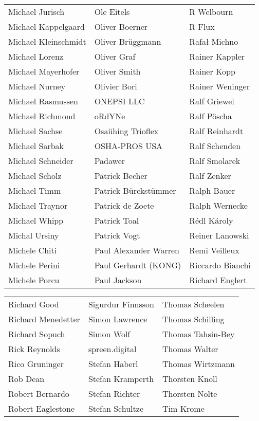 \begin{small}
\begin{tabular}{p{4cm}p{4cm}p{4cm}}
Michael Jurisch & Ole Eitels & R Welbourn \\
Michael Kappelgaard & Oliver Boerner & R-Flux \\
Michael Kleinschmidt & Oliver Brüggmann & Rafał Michno \\
Michael Lorenz & Oliver Graf & Rainer Kappler \\
Michael Mayerhofer & Oliver Smith & Rainer Kopp \\
Michael Nurney & Olivier Bori & Rainer Weninger \\
Michael Rasmussen & ONEPSI LLC & Ralf Griewel \\
Michael Richmond & oRdYNe & Ralf Pöscha \\
Michael Sachse & Osaühing Trioflex & Ralf Reinhardt \\
Michael Sarbak & OSHA-PROS USA & Ralf Schenden \\
Michael Schneider & Padawer & Ralf Smolarek \\
Michael Scholz & Patrick Becher & Ralf Zenker \\
Michael Timm & Patrick Bürckstümmer & Ralph Bauer \\
Michael Traynor & Patrick de Zoete & Ralph Wernecke \\
Michael Whipp & Patrick Toal & Rédl Károly \\
Michal Ursiny & Patrick Vogt & Reiner Lanowski \\
Michele Chiti & Paul Alexander Warren & Remi Veilleux \\
Michele Perini & Paul Gerhardt (KONG) & Riccardo Bianchi \\
Michele Porcu & Paul Jackson & Richard Englert \\
\end{tabular}
\newpage
\setlength{\tabcolsep}{1mm}
\begin{tabular}{p{4cm}p{4cm}p{4cm}}
Richard Good & Sigurdur Finnsson & Thomas Scheelen \\
Richard Menedetter & Simon Lawrence & Thomas Schilling \\
Richard Sopuch & Simon Wolf & Thomas Tahsin-Bey \\
Rick Reynolds & spreen.digital & Thomas Walter \\
Rico Gruninger & Stefan Haberl & Thomas Wirtzmann \\
Rob Dean & Stefan Kramperth & Thorsten Knoll \\
Robert Bernardo & Stefan Richter & Thorsten Nolte \\
Robert Eaglestone & Stefan Schultze & Tim Krome \\

\end{tabular}
\end{small}
